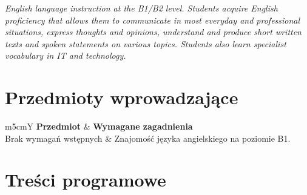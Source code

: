 \documentclass[12pt, a4paper]{article}
\newcommand{\thdrule}{\noalign{\global\setlength{\extrarowheight}{0pt}}}
\newcommand{\thdend}{\noalign{\global\setlength{\extrarowheight}{3pt}}}
\begin{document}
\textit{English language instruction at the B1/B2 level. Students acquire English proficiency that allows them to communicate in most everyday and professional situations, express thoughts and opinions, understand and produce short written texts and spoken statements on various topics. Students also learn specialist vocabulary in IT and technology.}


\section{Przedmioty wprowadzające}

{\scriptsize
\begin{tabularx}{\textwidth}{m{5cm}Y}
\thdrule\toprule
{} {\color{white}\textbf{Przedmiot}} & {\color{white}\textbf{Wymagane zagadnienia}} \\
\midrule\thdend
   Brak wymagań wstępnych & Znajomość języka angielskiego na poziomie B1. \\
\bottomrule
\end{tabularx}}

\section{Treści programowe}
\end{document}
